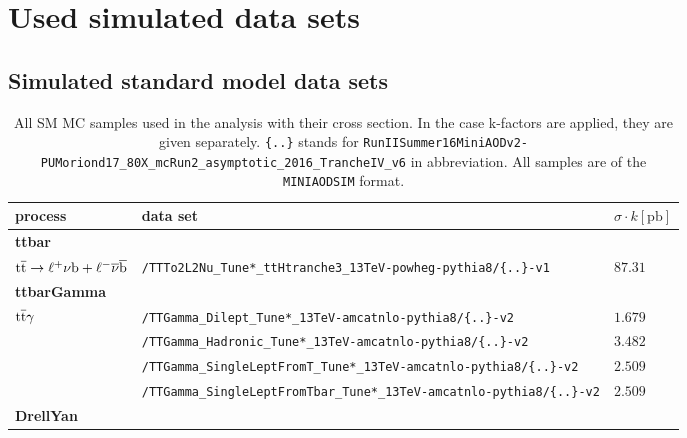 \chapter{Used simulated data sets}
\section*{Simulated standard model data sets}
\begin{table}[tb]
 \centering
 \caption{All SM MC samples used in the analysis with their cross section. In the case k-factors are applied, they are given separately. \texttt{\{..\}} stands for \texttt{RunIISummer16MiniAODv2-PUMoriond17\_80X\_mcRun2\_asymptotic\_2016\_TrancheIV\_v6} in abbreviation. All samples are of the \texttt{MINIAODSIM} format.}
 \scriptsize
 \label{tab:app_MCsets}
 \begin{tabular}[width=\textwidth]{lll}
  \hline
  \normalsize{process}                             & \normalsize{data set}   & \normalsize{$\sigma\cdot k[\mathrm{pb}]$} \\\hline
  \scriptsize{\textbf{ttbar}}                      &                         &                                           \\
  ${\mathrm{t}\overline{\mathrm{t}}}\to\ell^{+}\nu\mathrm{b}+\ell^{-}\overline{\nu}\overline{\mathrm{b}}$ & \verb|/TTTo2L2Nu_Tune*_ttHtranche3_13TeV-powheg-pythia8/{..}-v1|  & $87.31$                                   \\
  \scriptsize{\textbf{ttbarGamma}}                 &                         &                                           \\
  ${\mathrm{t}\overline{\mathrm{t}}}\gamma$                                     & \verb|/TTGamma_Dilept_Tune*_13TeV-amcatnlo-pythia8/{..}-v2|  & $1.679$                                   \\
                                                   & \verb|/TTGamma_Hadronic_Tune*_13TeV-amcatnlo-pythia8/{..}-v2|  & $3.482$                                   \\
                                                   & \verb|/TTGamma_SingleLeptFromT_Tune*_13TeV-amcatnlo-pythia8/{..}-v2|  & $2.509$                                   \\
                                                   & \verb|/TTGamma_SingleLeptFromTbar_Tune*_13TeV-amcatnlo-pythia8/{..}-v2|  & $2.509$                                   \\
  \scriptsize{\textbf{DrellYan}}                   &                         &                                           \\

\end{tabular}
\end{table}
